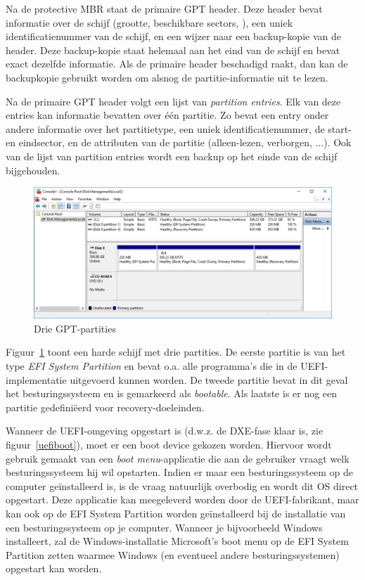 Na de protective MBR staat de primaire GPT header. Deze header bevat informatie over de schijf (grootte, beschikbare sectors, ), een uniek identificatienummer van de schijf, en een wijzer naar een backup-kopie van de header. Deze backup-kopie staat helemaal aan het eind van de schijf en bevat exact dezelfde informatie. Als de primaire header beschadigd raakt, dan kan de backupkopie gebruikt worden om alsnog de partitie-informatie uit te lezen.

Na de primaire GPT header volgt een lijst van \emph{partition entries}. Elk van deze entries kan informatie bevatten over \'e\'en partitie. Zo bevat een entry onder andere informatie over het partitietype, een uniek identificatienummer, de start- en eindsector, en de attributen van de partitie (alleen-lezen, verborgen, ...). Ook van de lijst van partition entries wordt een backup op het einde van de schijf bijgehouden.

\begin{figure}
\begin{center}
\includegraphics[width=125mm]{images/diskmgr.png}
\end{center}
\caption{Drie GPT-partities}
\label{efisyspart}
\end{figure}

Figuur~\ref{efisyspart} toont een harde schijf met drie partities. De eerste partitie
is van het type \emph{EFI System Partition} en bevat o.a. alle programma's die in de 
UEFI-implementatie uitgevoerd kunnen worden. De tweede partitie bevat in dit geval het
besturingssysteem en is gemarkeerd als \emph{bootable}. Als laatste is er nog een partitie
gedefini\"eerd voor recovery-doeleinden.

Wanneer de UEFI-omgeving opgestart is (d.w.z. de DXE-fase klaar is, zie figuur~\ref{uefiboot}), moet er een
boot device gekozen worden. Hiervoor wordt gebruik gemaakt van een \emph{boot menu}-applicatie
die aan de gebruiker vraagt welk besturingssysteem hij wil opstarten. Indien er maar
een besturingssysteem op de computer ge\"installeerd is, is de vraag natuurlijk overbodig
en wordt dit OS direct opgestart. Deze applicatie kan meegeleverd worden door de UEFI-fabrikant, maar kan
ook op de EFI System Partition worden ge\"installeerd bij de installatie van een besturingssysteem op je computer.
Wanneer je bijvoorbeeld Windows installeert, zal de Windows-installatie Microsoft's
boot menu op de EFI System Partition zetten waarmee Windows (en eventueel andere besturingssystemen)
opgestart kan worden.

